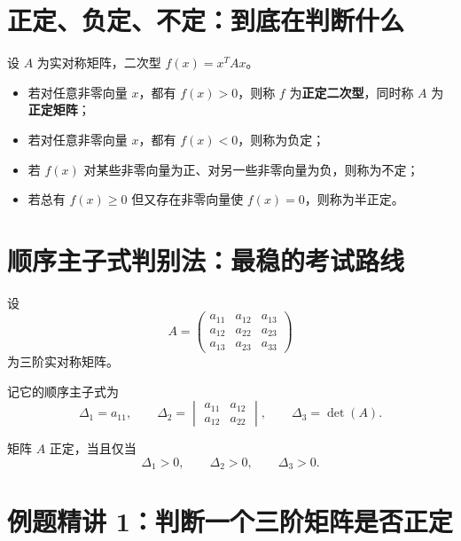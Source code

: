 \documentclass[11pt,oneside,UTF8]{ctexbook}
\newcommand{\important}[1]{\textcolor{Sakura}{\textbf{#1}}}
\begin{document}
\section{正定、负定、不定：到底在判断什么}

设 \(A\) 为实对称矩阵，二次型 \(f(x)=x^TAx\)。

\begin{itemize}
  \item 若对任意非零向量 \(x\)，都有 \(f(x)>0\)，则称 \(f\) 为\important{正定二次型}，同时称 \(A\) 为\important{正定矩阵}；
  \item 若对任意非零向量 \(x\)，都有 \(f(x)<0\)，则称为负定；
  \item 若 \(f(x)\) 对某些非零向量为正、对另一些非零向量为负，则称为不定；
  \item 若总有 \(f(x)\ge 0\) 但又存在非零向量使 \(f(x)=0\)，则称为半正定。
\end{itemize}

\section{顺序主子式判别法：最稳的考试路线}

设
\[
A=
\begin{pmatrix}
a_{11}&a_{12}&a_{13}\\
a_{12}&a_{22}&a_{23}\\
a_{13}&a_{23}&a_{33}
\end{pmatrix}
\]
为三阶实对称矩阵。

记它的顺序主子式为
\[
\Delta_1=a_{11},\qquad
\Delta_2=
\begin{vmatrix}
a_{11}&a_{12}\\
a_{12}&a_{22}
\end{vmatrix},
\qquad
\Delta_3=\det(A).
\]

\begin{summarybox}
矩阵 \(A\) 正定，当且仅当
\[
\Delta_1>0,\qquad \Delta_2>0,\qquad \Delta_3>0.
\]
\end{summarybox}

\section{例题精讲 1：判断一个三阶矩阵是否正定}
\end{document}
